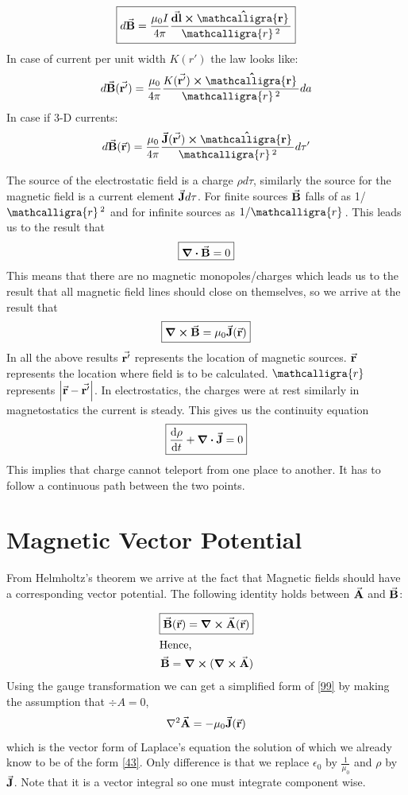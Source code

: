 \documentclass[12pt, oneside]{book}
\newcommand{\scriptr}{\mathcalligra{r}\,}
\begin{document}
\begin{equation}
	\boxed{
	d\va{B}=\frac{\mu_0 I}{4\pi}\dfrac{\va{dl}\cross\vu{\scriptr}}{\scriptr^2}}
\end{equation}
In case of current per unit width $K(r')$ the law looks like:
\begin{equation}
	d\va{B}(\va{r'})=\frac{\mu_0}{4\pi}\dfrac{K(\va{r'})\cross\vu{\scriptr}}{\scriptr^2}da
\end{equation}
In case if 3-D currents:
\begin{equation}
	d\va{B}(\va{r})=\frac{\mu_0}{4\pi}\dfrac{\va{J}(\va{r'})\cross\vu{\scriptr}}{\scriptr^2}d\tau'
\end{equation}

The source of the electrostatic field is a charge $\rho d\tau$, similarly the source for the magnetic field is a current element $\va{J}d\tau$. For finite sources $\va{B}$ falls of as 1/$\scriptr^2$ and for infinite sources as $1/\scriptr$. This leads us to the result that 
\begin{equation}
      \boxed{\div{\va{B}}=0}
\end{equation}
This means that there are no magnetic monopoles/charges which leads us to the result that all magnetic field lines should close on themselves, so we arrive at the result that
\begin{equation}
\boxed{	\curl{\va{B}}=\mu_0 \va{J}(\va{r})}
\end{equation}
In all the above results $\va{r'}$ represents the location of magnetic sources. $\va{r}$ represents the location where field is to be calculated. $\scriptr$ represents $\abs{\va{r}-\va{r'}}$. In electrostatics, the charges were at rest similarly in magnetostatics the current is steady. This gives us the continuity equation
\begin{equation}
	\boxed{\dv{\rho}{t}+\div{\va{J}}=0}
\end{equation}
This implies that charge cannot teleport from one place to another. It has to follow a continuous path between the two points. 
\section{Magnetic Vector Potential}
From Helmholtz's theorem we arrive at the fact that Magnetic fields should have a corresponding vector potential. The following identity holds between $\va{A}$ and $\va{B}$:

\begin{align}
	\boxed{\va{B}(\va{r})=\curl{\va{A}(\va{r})}} \\
	\intertext{Hence,}
	\va{B}=\curl{(\curl{\va{A}})}\label{99}
\end{align}
Using the gauge transformation we can get a simplified form of \eqref{99} by making the assumption that $\div{A}=0$,
\begin{equation*}
	\laplacian{\va{A}}=-\mu_0\va{J}(\va{r})
\end{equation*}
which is the vector form of Laplace's equation the solution of which we already know to be of the form
\eqref{43}. Only difference is that we replace $\epsilon_0$ by $\tfrac{1}{\mu_0}$ and $\rho$ by $\va{J}$. Note that it is a vector integral so one must integrate component wise. 
\end{document}
